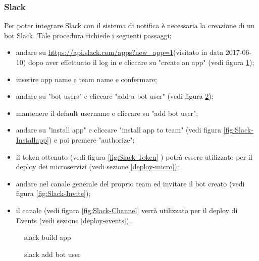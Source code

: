 \subsubsection{Slack}\label{slack}
Per poter integrare Slack con il sistema di notifica è necessaria la creazione di un bot Slack. Tale procedura richiede i seguenti passaggi:
\begin{itemize}
\item andare su \url{https://api.slack.com/apps?new_app=1}(visitato in data 2017-06-10) dopo aver effettuato il log in e cliccare su "create an app" (vedi figura \ref{fig:Slack-Buildapp});
\item inserire app name e team name e confermare;
\item andare su "bot users" e cliccare "add a bot user" (vedi figura \ref{fig:Slack-Botuser});
\item mantenere il default username e cliccare su "add bot user";
\item andare su "install app" e cliccare "install app to team" (vedi figura \ref{fig:Slack-Installapp}) e poi premere "authorize";
\item il token ottenuto (vedi figura \ref{fig:Slack-Token} ) potrà essere utilizzato per il deploy dei microservizi (vedi sezione \ref{deploy-micro});
\item andare nel canale generale del proprio team ed invitare il bot creato (vedi figura \ref{fig:Slack-Invite});
\item il canale (vedi figura \ref{fig:Slack-Channel} verrà utilizzato per il deploy di Events (vedi sezione \ref{deploy-events}).
\end{itemize}
\begin{figure}[h]
	\caption{slack build app}\label{fig:Slack-Buildapp}
\end{figure}
\begin{figure}[h]
	\caption{slack add bot user}\label{fig:Slack-Botuser}
\end{figure}
